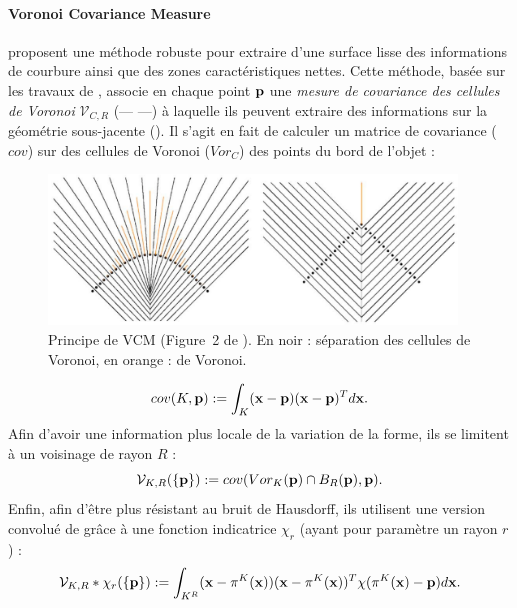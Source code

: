 \paragraph{Voronoi Covariance Measure}
%
 proposent une méthode robuste pour extraire
d'une surface lisse des informations de courbure ainsi que des zones
caractéristiques nettes. Cette méthode, basée sur les travaux de
, associe en chaque point $\mathbf{p}$ une \emph{mesure de
covariance des cellules de Voronoi} $\mathcal{V}_{C,R}$ (\VCMM --- \VCM ---) à
laquelle ils peuvent extraire des informations sur la géométrie sous-jacente
(). Il s'agit en fait de calculer un matrice de
covariance ($cov$) sur des cellules de Voronoi ($Vor_C$) des points du bord de
l'objet :
%
\begin{figure}[ht]{
    \begin{center}
    \includegraphics[height=4cm]{images/Feature/VCM}
    \end{center}}
    \caption[Notations.]{Principe de VCM (Figure~2 de \cite{Merigot2011}). En noir : séparation des cellules de Voronoi, en orange :  de Voronoi.
      \label{fig:mellado-VCM}}
\end{figure}
%
\begin{equation}
    cov(K,\mathbf{p}) := \int_K (\mathbf{x} - \mathbf{p})(\mathbf{x} - \mathbf{p})^T d\mathbf{x} .
\end{equation}
%
Afin d'avoir une information plus locale de la variation de la forme, ils se
limitent à un voisinage de rayon $R$ :
%
\begin{equation}
  \mathcal{V}_{K,R}(\{\mathbf{p}\}) := cov(Vor_K(\mathbf{p}) \cap B_{R}(\mathbf{p}), \mathbf{p}) .
\end{equation}
%
Enfin, afin d'être plus résistant au bruit de Hausdorff, ils utilisent une
version convolué de \VCM grâce à une fonction indicatrice $\chi_r$
(ayant pour paramètre un rayon $r$) :
%
\begin{equation}
  \mathcal{V}_{K,R} \ast \chi_r(\{\mathbf{p}\}) := \int_{K^R} (\mathbf{x} - \pi^K(\mathbf{x}))(\mathbf{x} - \pi^K(\mathbf{x}))^T \chi(\pi^K(\mathbf{x}) - \mathbf{p}) d\mathbf{x} .
\end{equation}
